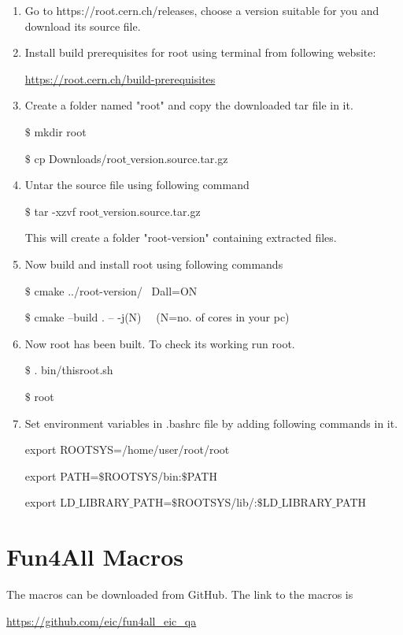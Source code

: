 \begin{enumerate}
	\item Go to https://root.cern.ch/releases, choose a version suitable for you and download its source file.
	\item Install 
	build prerequisites 
	for root using terminal from following website:
	
	\href{https://root.cern.ch/build-prerequisites}{https://root.cern.ch/build-prerequisites}
	\item Create a folder named "root" and copy the downloaded tar file in it.
	
	$\$$ mkdir root
	
	$\$$ cp Downloads/root$\_$version.source.tar.gz
	
	\item Untar the source file using following command 
	
	$\$$ tar -xzvf root$\_$version.source.tar.gz
	
	This will create a folder "root-version" containing extracted files.
	
	\item Now build and install root using following commands
	
	$\$$ cmake ../root-version/  \, Dall=ON
	
	$\$$ cmake --build . -- -j(N)  \, \, (N=no. of cores in your pc)
	
	\item Now root has been built. To check its working run root.
	
	$\$$ . bin/thisroot.sh
	
	$\$$ root
	
	\item Set environment variables in .bashrc file by adding following commands in it.
	
	export ROOTSYS=/home/user/root/root
	
	export PATH=$\$$ROOTSYS/bin:$\$$PATH
	
	export LD$\_$LIBRARY$\_$PATH=$\$$ROOTSYS/lib/:$\$$LD$\_$LIBRARY$\_$PATH

\end{enumerate}


\section{Fun4All Macros}
The macros can be downloaded from GitHub. The link to the macros is 

\href{https://github.com/eic/fun4all_eic_qa}{https://github.com/eic/fun4all\_eic\_qa} 

